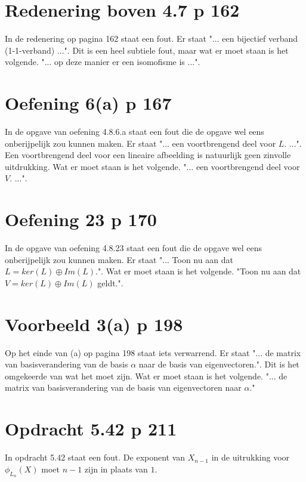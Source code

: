 \documentclass[lineaire_algebra_oplossingen.tex]{subfiles}
\begin{document}
\section{Redenering boven 4.7 p 162}
In de redenering op pagina 162 staat een fout. Er staat "... een bijectief verband (1-1-verband) ...".
Dit is een heel subtiele fout, maar wat er moet staan is het volgende. "... op deze manier er een isomofisme is ...". 

\section{Oefening 6(a) p 167}
In de opgave van oefening 4.8.6.a staat een fout die de opgave wel eens onberijpelijk zou kunnen maken.
Er staat "... een voortbrengend deel voor $L$. ...".
Een voortbrengend deel voor een lineaire afbeelding is natuurlijk geen zinvolle uitdrukking.
Wat er moet staan is het volgende. "... een voortbrengend deel voor $V$. ...".

\section{Oefening 23 p 170}
In de opgave van oefening 4.8.23 staat een fout die de opgave wel eens onberijpelijk zou kunnen maken.
Er staat "... Toon nu aan dat $L = ker(L) \oplus Im(L)$.".
Wat er moet staan is het volgende.
"Toon nu aan dat $V = ker(L) \oplus Im(L)$ geldt.".

\section{Voorbeeld 3(a) p 198}
Op het einde van (a) op pagina 198 staat iets verwarrend.
Er staat "... de matrix van basisverandering van de basis $\alpha$ naar de basis van eigenvectoren.".
Dit is het omgekeerde van wat het moet zijn.
Wat er moet staan is het volgende.
"... de matrix van basisverandering van de basis van eigenvectoren naar $\alpha$."

\section{Opdracht 5.42 p 211}
In opdracht 5.42 staat een fout. De exponent van $X_{n-1}$ in de uitrukking voor $\phi_{L_{n}}(X)$ moet $n-1$ zijn in plaats van $1$.
\end{document}
